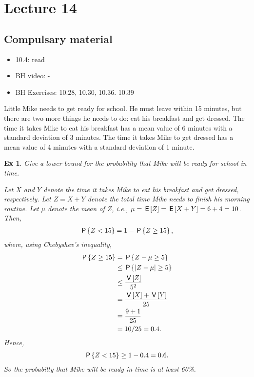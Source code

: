 \documentclass[a4paper,11pt]{article}
\newtheorem{exercise}[theorem]{Ex}
\begin{document}
\section{Lecture 14}

\subsection{Compulsary material}
\label{sec:compulsary-material}



\begin{itemize}
\item 10.4: read
\item BH video: -
\item BH Exercises: 10.28, 10.30, 10.36. 10.39
\end{itemize}


Little Mike needs to get ready for school. He must leave within 15 minutes, but there are two more things he needs to do: eat his breakfast and get dressed. The time it takes Mike to eat his breakfast has a mean value of 6 minutes with a standard deviation of 3 minutes. The time it takes Mike to get dressed has a mean value of 4 minutes with a standard deviation of 1 minute.
\begin{exercise}
Give a lower bound for the probability that Mike will be ready for school in time.
\begin{solution}
Let $X$ and $Y$ denote the time it takes Mike to eat his breakfast and get dressed, respectively. Let $Z = X + Y$ denote the total time Mike needs to finish his morning routine. Let $\mu$ denote the mean of $Z$, i.e., $\mu = \E{Z} = \E{X+Y} = 6+4 = 10$. Then,
\begin{align}
    \P{Z < 15} = 1 - \P{Z \geq 15},
\end{align}
where, using Chebyshev's inequality,
\begin{align}
  \P{Z \geq 15} &= \P{Z - \mu \geq 5} \\
  &\leq \P{|Z - \mu| \geq 5} \\
  &\leq \frac{\V{Z}}{5^2} \\
  &= \frac{\V{X} + \V{Y}}{25} \\
  &= \frac{9 + 1}{25} \\
  &= 10/25 = 0.4.
\end{align}
Hence,
\begin{align}
    \P{Z < 15} \geq 1 - 0.4 = 0.6.
\end{align}
So the probabilty that Mike will be ready in time is at least 60\%.
\end{solution}
\end{exercise}
\end{document}
